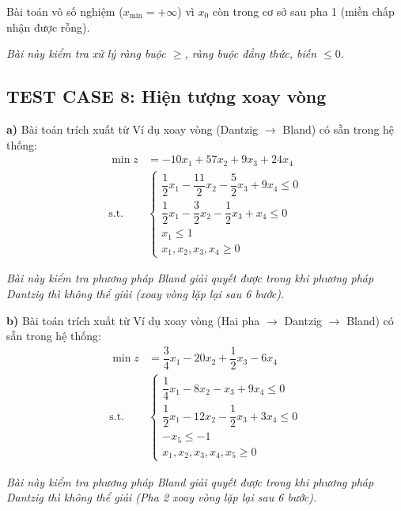 \documentclass[12pt,a4paper]{article}
\begin{document}
Bài toán vô số nghiệm ($x_{\min} = + \infty$) vì $x_0$ còn trong cơ sở sau pha 1 (miền chấp nhận được rỗng).

\textit{Bài này kiểm tra xử lý ràng buộc $\geq$, ràng buộc đẳng thức, biến $\leq 0$.}

\subsection*{TEST CASE 8: Hiện tượng xoay vòng}

\noindent \textbf{a)} Bài toán trích xuất từ \colorbox{green!30}{Ví dụ xoay vòng (Dantzig $\rightarrow$ Bland)} có sẵn trong hệ thống:
\begin{align*}
    \min z &= -10x_1 + 57x_2 + 9x_3 + 24x_4 \\
    \text{s.t.} \quad 
    &\begin{cases}
        \dfrac{1}{2}x_1 - \dfrac{11}{2}x_2 - \dfrac{5}{2}x_3 + 9x_4 \leq 0 \\
        \dfrac{1}{2}x_1 - \dfrac{3}{2}x_2 - \dfrac{1}{2}x_3 + x_4 \leq 0 \\
        x_1 \leq 1 \\
        x_1, x_2, x_3, x_4 \geq 0
    \end{cases}
\end{align*}

\textit{Bài này kiểm tra phương pháp Bland giải quyết được trong khi phương pháp Dantzig thì không thể giải (xoay vòng lặp lại sau 6 bước).}

\noindent \textbf{b)} Bài toán trích xuất từ \colorbox{green!30}{Ví dụ xoay vòng (Hai pha $\rightarrow$ Dantzig $\rightarrow$ Bland)} có sẵn trong hệ thống:
\begin{align*}
    \min z &= \dfrac{3}{4}x_1 - 20x_2 + \dfrac{1}{2}x_3 - 6x_4 \\
    \text{s.t.} \quad 
    &\begin{cases}
        \dfrac{1}{4}x_1 - 8x_2 - x_3 + 9x_4 \leq 0 \\
        \dfrac{1}{2}x_1 - 12x_2 - \dfrac{1}{2}x_3 + 3x_4 \leq 0 \\
        -x_5 \leq -1 \\
        x_1, x_2, x_3, x_4, x_5 \geq 0
    \end{cases}
\end{align*}

\textit{Bài này kiểm tra phương pháp Bland giải quyết được trong khi phương pháp Dantzig thì không thể giải (Pha 2 xoay vòng lặp lại sau 6 bước).}
\end{document}
